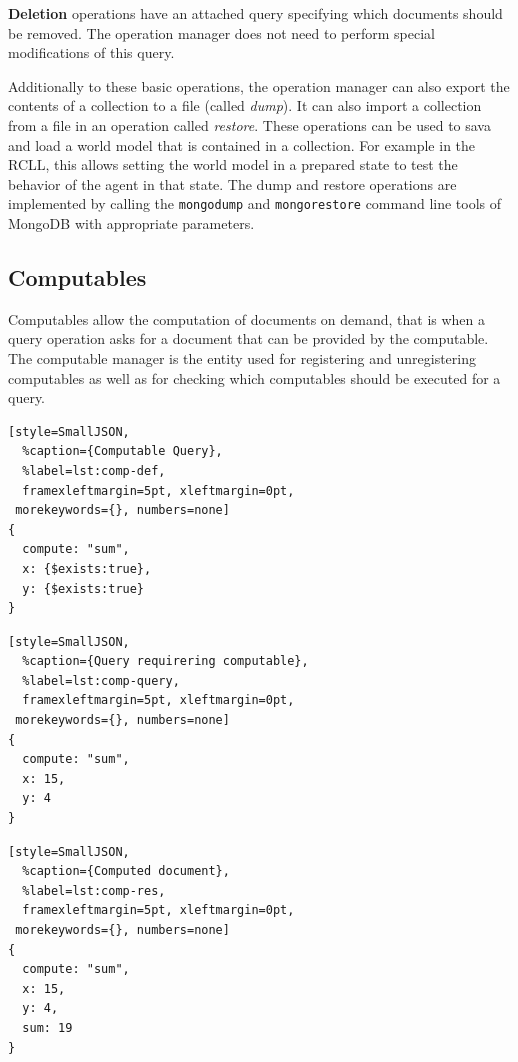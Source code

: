 \textbf{Deletion} operations have an attached query specifying which
documents should be removed. The operation manager does not need to
perform special modifications of this query.

Additionally to these basic operations, the operation manager can also
export the contents of a collection to a file (called \emph{dump}). It
can also import a collection from a file in an operation called
\emph{restore}. These operations can be used to sava and load a world
model that is contained in a collection. For example in the RCLL, this
allows setting the world model in a prepared state to test the
behavior of the agent in that state. The dump and restore operations
are implemented by calling the \texttt{mongodump} and
\texttt{mongorestore} command line tools of MongoDB with appropriate
parameters.

\subsection{Computables}
\label{sec:impl-computables}
Computables allow the computation of documents on demand, that is when
a query operation asks for a document that can be provided by the
computable. The computable manager is the entity used for registering
and unregistering computables as well as for checking which
computables should be executed for a query.\\
\begin{listing}
\addtocounter{lstlisting}{1}
\noindent
\begin{minipage}[b]{.30\textwidth}
\begin{lstlisting}[style=SmallJSON,
  %caption={Computable Query},
  %label=lst:comp-def,
  framexleftmargin=5pt, xleftmargin=0pt,
 morekeywords={}, numbers=none]
{
  compute: "sum",
  x: {$exists:true},
  y: {$exists:true}
}
\end{lstlisting}
\end{minipage}%
\hfill
\begin{minipage}[b]{.25\textwidth}
\begin{lstlisting}[style=SmallJSON,
  %caption={Query requirering computable},
  %label=lst:comp-query,
  framexleftmargin=5pt, xleftmargin=0pt,
 morekeywords={}, numbers=none]
{
  compute: "sum",
  x: 15,
  y: 4
}
\end{lstlisting}
\end{minipage}%
\hfill
\begin{minipage}[b]{.25\textwidth}
\begin{lstlisting}[style=SmallJSON,
  %caption={Computed document},
  %label=lst:comp-res,
  framexleftmargin=5pt, xleftmargin=0pt,
 morekeywords={}, numbers=none]
{
  compute: "sum",
  x: 15,
  y: 4,
  sum: 19
}
\end{lstlisting}
  \vspace{-0.3cm}
  \vspace{0.3cm}
\end{minipage}%
\caption{Queries and documents involved in a computable for addition}
\label{lst:comp}
\end{listing}


